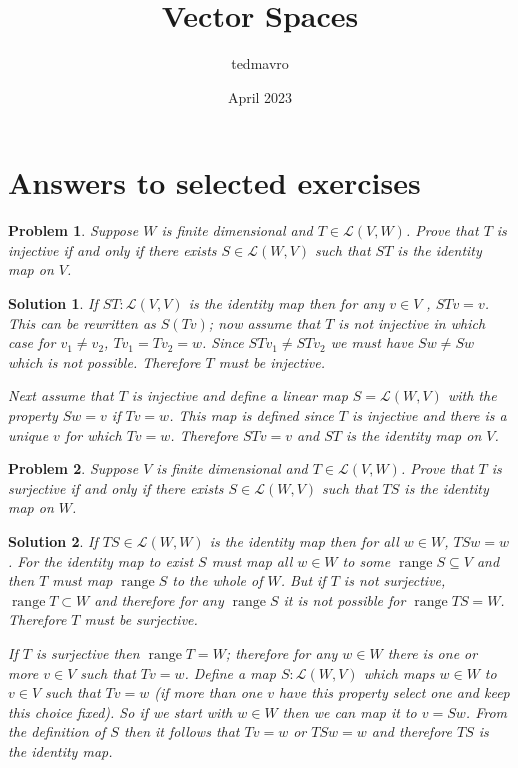 \documentclass[11pt,a4paper]{scrartcl}
\title{Vector Spaces}
\author{tedmavro }
\date{April 2023}
\DeclareMathOperator{\range}{range}
\newcommand{\lmap}[2]{\mathcal{L}(#1,#2)}
\theoremstyle{solve}
\newtheorem{problem}{Problem}
\newtheorem*{solution}{Solution}
\begin{document}
\maketitle

\section{Answers to selected exercises}

\begin{problem}
Suppose $W$ is finite dimensional and $T \in  \lmap{V}{W}$. Prove that $T$ is injective if and only if there exists $S \in \lmap{W}{V}$ such that $ST$ is the identity map on $V$.
\end{problem}
\begin{solution}
If $ST:\lmap{V}{V}$ is the identity map then for any $v\in V$
, $STv=v$. This can be rewritten as $S(Tv)$; now assume that $T$ is not injective in which case for $v_1\neq v_2$, 
$Tv_1=Tv_2=w$. Since $STv_1 \neq STv_2$ we must have
$Sw \neq Sw$ which is not possible. Therefore $T$ must be injective.

\noindent Next assume that $T$ is injective and define a linear map $S=\lmap{W}{V}$ with the property 
$Sw=v$ if $Tv=w$. This map is defined since $T$ is injective and there is a unique $v$ for which $Tv=w$. Therefore 
$STv=v$ and $ST$ is the identity map on $V$.
\end{solution}

\begin{problem}
Suppose $V$ is finite dimensional and $T \in  \lmap{V}{W}$. Prove that $T$ is surjective if and only if there exists $S \in \lmap{W}{V}$ such that $TS$ is the identity map on $W$.
\end{problem}
\begin{solution}
If $TS \in \lmap{W}{W}$ is the identity map then for all $w \in W$, $TSw=w$. For the identity map to exist $S$ must map all $w\in W$ to some $\range{S}\subseteq V$ and then $T$ must map
$\range S$ to the whole of $W$. But if $T$ is not surjective,
$\range{T}\subset W$ and therefore for any $\range{S}$ it is not possible for $\range{TS}=W$. Therefore $T$ must be surjective.

\noindent If $T$ is surjective then $\range{T}=W$; therefore
for any $w\in W$ there is one or more $v\in V$ such that $Tv=w$. Define a map $S:\lmap{W}{V}$ which maps $w\in W$ to
$v\in V$ such that $Tv=w$ (if more than one $v$ have this property select one and keep this choice fixed). So if we start with $w\in W$ then we can map it to $v=Sw$. From the definition of $S$ then it follows that $Tv=w$ or $TSw=w$ and therefore $TS$ is the identity map. 
\end{solution}
\end{document}
